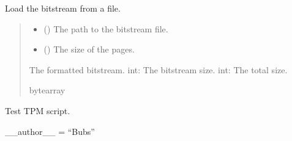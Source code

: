 \documentclass[letterpaper,10pt,english]{sphinxmanual}
\begin{document}
\begin{fulllineitems}
\label{\detokenize{cplddocs:mcu_update.loadBitstream}}
\pysigstartsignatures
{}
\pysigstopsignatures
\sphinxAtStartPar
Load the bitstream from a file.
\begin{quote}\begin{description}
\begin{itemize}
\item {} 
\sphinxAtStartPar
{} () \textendash{} The path to the bitstream file.

\item {} 
\sphinxAtStartPar
{} () \textendash{} The size of the pages.

\end{itemize}

\sphinxAtStartPar
The formatted bitstream.
int: The bitstream size.
int: The total size.

\sphinxAtStartPar
bytearray

\end{description}\end{quote}

\end{fulllineitems}

\label{\detokenize{cplddocs:module-mng_update}}
\sphinxAtStartPar
Test TPM script.

\sphinxAtStartPar
\_\_author\_\_ = “Bubs”
\label{\detokenize{cplddocs:module-phy_marvell_88X2222_init}}
\end{document}
